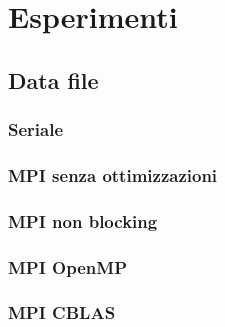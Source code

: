 \chapter{Esperimenti}
\section{Data file}
\subsection{Seriale}
\subsection{MPI senza ottimizzazioni}
\subsection{MPI non blocking}
\subsection{MPI OpenMP}
\subsection{MPI CBLAS}
